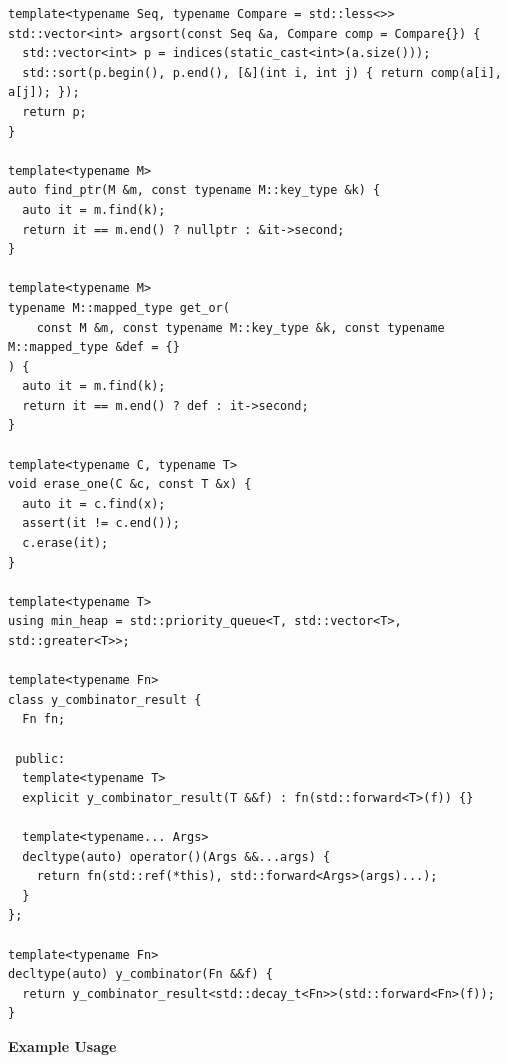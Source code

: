 \begin{lstlisting}[style=cpp]
template<typename Seq, typename Compare = std::less<>>
std::vector<int> argsort(const Seq &a, Compare comp = Compare{}) {
  std::vector<int> p = indices(static_cast<int>(a.size()));
  std::sort(p.begin(), p.end(), [&](int i, int j) { return comp(a[i], a[j]); });
  return p;
}

template<typename M>
auto find_ptr(M &m, const typename M::key_type &k) {
  auto it = m.find(k);
  return it == m.end() ? nullptr : &it->second;
}

template<typename M>
typename M::mapped_type get_or(
    const M &m, const typename M::key_type &k, const typename M::mapped_type &def = {}
) {
  auto it = m.find(k);
  return it == m.end() ? def : it->second;
}

template<typename C, typename T>
void erase_one(C &c, const T &x) {
  auto it = c.find(x);
  assert(it != c.end());
  c.erase(it);
}

template<typename T>
using min_heap = std::priority_queue<T, std::vector<T>, std::greater<T>>;

template<typename Fn>
class y_combinator_result {
  Fn fn;

 public:
  template<typename T>
  explicit y_combinator_result(T &&f) : fn(std::forward<T>(f)) {}

  template<typename... Args>
  decltype(auto) operator()(Args &&...args) {
    return fn(std::ref(*this), std::forward<Args>(args)...);
  }
};

template<typename Fn>
decltype(auto) y_combinator(Fn &&f) {
  return y_combinator_result<std::decay_t<Fn>>(std::forward<Fn>(f));
}
\end{lstlisting}
\textbf{Example Usage}\par
